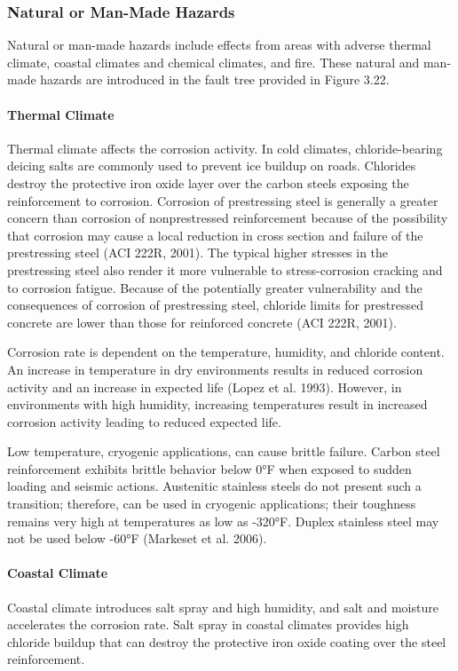 \subsubsection{Natural or Man-Made Hazards}
Natural or man-made hazards include effects from areas with adverse thermal climate, coastal climates and
chemical climates, and fire. These natural and man-made hazards are introduced in the fault tree provided in Figure
3.22.
\paragraph{Thermal Climate}
Thermal climate affects the corrosion activity. In cold climates, chloride-bearing deicing salts are commonly
used to prevent ice buildup on roads. Chlorides destroy the protective iron oxide layer over the carbon steels
exposing the reinforcement to corrosion. Corrosion of prestressing steel is generally a greater concern than corrosion
of nonprestressed reinforcement because of the possibility that corrosion may cause a local reduction in cross section
and failure of the prestressing steel (ACI 222R, 2001). The typical higher stresses in the prestressing steel also render
it more vulnerable to stress-corrosion cracking and to corrosion fatigue. Because of the potentially greater vulnerability and the consequences of corrosion of prestressing steel, chloride limits for prestressed concrete are
lower than those for reinforced concrete (ACI 222R, 2001).

Corrosion rate is dependent on the temperature, humidity, and chloride content. An increase in temperature in
dry environments results in reduced corrosion activity and an increase in expected life (Lopez et al. 1993). However,
in environments with high humidity, increasing temperatures result in increased corrosion activity leading to reduced
expected life.

Low temperature, cryogenic applications, can cause brittle failure. Carbon steel reinforcement exhibits brittle
behavior below 0°F when exposed to sudden loading and seismic actions. Austenitic stainless steels do not present
such a transition; therefore, can be used in cryogenic applications; their toughness remains very high at temperatures
as low as -320°F. Duplex stainless steel may not be used below -60°F (Markeset et al. 2006).

\paragraph{Coastal Climate}
Coastal climate introduces salt spray and high humidity, and salt and moisture accelerates the corrosion rate. Salt
spray in coastal climates provides high chloride buildup that can destroy the protective iron oxide coating over the
steel reinforcement.

